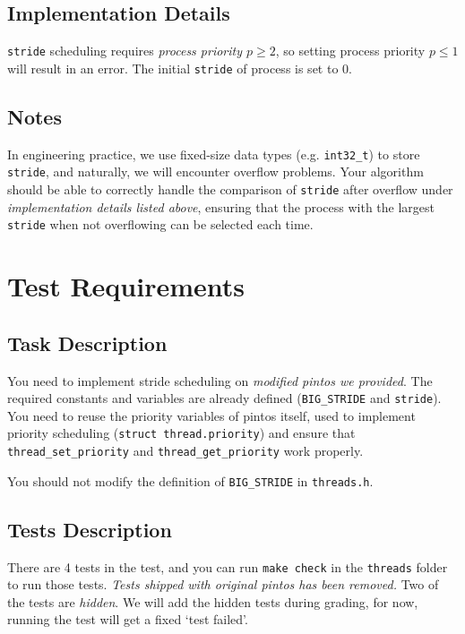 \documentclass{article}
\begin{document}
\subsection{Implementation Details}
\begin{outline}
    \1 \texttt{stride} scheduling requires \emph{process priority $p \ge 2$}, so setting process priority $p \le 1$ will result in an error.
    \1 The initial \texttt{stride} of process is set to 0.
\end{outline}

\subsection{Notes}
In engineering practice, we use fixed-size data types (e.g. \texttt{int32\_t}) to store \texttt{stride}, and naturally, we will encounter overflow problems. Your algorithm should be able to correctly handle the comparison of \texttt{stride} after overflow under \emph{implementation details listed above}, ensuring that the process with the largest \texttt{stride} when not overflowing can be selected each time.

\section{Test Requirements}
\subsection{Task Description}
You need to implement stride scheduling on \emph{modified pintos we provided}. The required constants and variables are already defined (\texttt{BIG\_STRIDE} and \texttt{stride}). You need to reuse the priority variables of pintos itself, used to implement priority scheduling (\texttt{struct thread.priority}) and ensure that \texttt{thread\_set\allowbreak\_priority} and \texttt{thread\_get\_priority} work properly.

You should not modify the definition of \texttt{BIG\_STRIDE} in \texttt{threads.h}.

\subsection{Tests Description}

There are 4 tests in the test, and you can run \texttt{make check} in the \texttt{threads} folder to run those tests. \emph{Tests shipped with original pintos has been removed.} Two of the tests are \emph{hidden}. We will add the hidden tests during grading, for now, running the test will get a fixed `test failed'.
\end{document}
